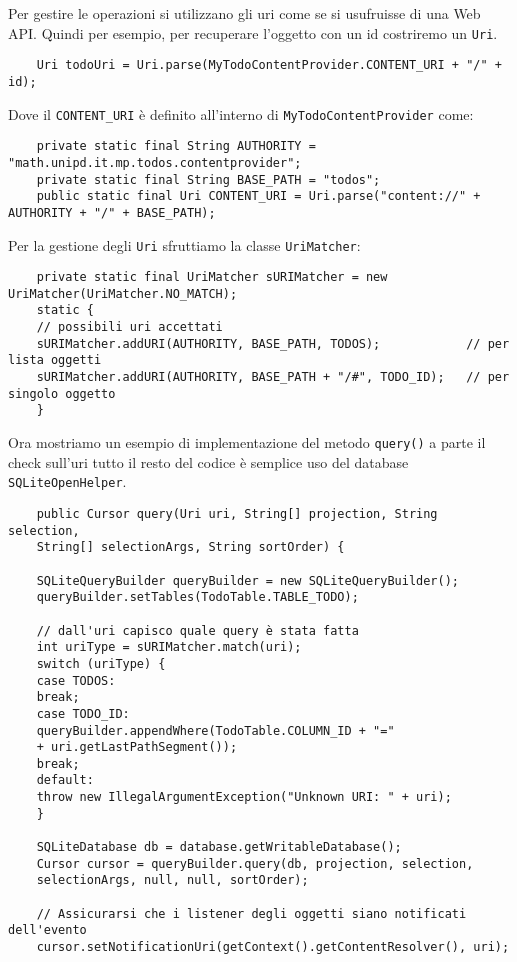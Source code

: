 \begin{itemize}
	Per gestire le operazioni si utilizzano gli uri come se si usufruisse di una Web API. Quindi per esempio, per recuperare l'oggetto con un id costriremo un \lstinline|Uri|.
	\begin{lstlisting}
	Uri todoUri = Uri.parse(MyTodoContentProvider.CONTENT_URI + "/" + id);
	\end{lstlisting}
	
	Dove il \lstinline|CONTENT_URI| è definito all'interno di \lstinline|MyTodoContentProvider| come:
	\begin{lstlisting}
	private static final String AUTHORITY = "math.unipd.it.mp.todos.contentprovider";
	private static final String BASE_PATH = "todos";
	public static final Uri CONTENT_URI = Uri.parse("content://" + AUTHORITY + "/" + BASE_PATH);
	\end{lstlisting}
	
	Per la gestione degli \lstinline|Uri| sfruttiamo la classe \lstinline|UriMatcher|:
	\begin{lstlisting}
	private static final UriMatcher sURIMatcher = new UriMatcher(UriMatcher.NO_MATCH);
	static {
	// possibili uri accettati
	sURIMatcher.addURI(AUTHORITY, BASE_PATH, TODOS);			// per lista oggetti
	sURIMatcher.addURI(AUTHORITY, BASE_PATH + "/#", TODO_ID);	// per singolo oggetto
	}
	\end{lstlisting}
	
	Ora mostriamo un esempio di implementazione del metodo \lstinline|query()| a parte il check sull'uri tutto il resto del codice è semplice uso del database \lstinline|SQLiteOpenHelper|.
	\begin{lstlisting}
	public Cursor query(Uri uri, String[] projection, String selection,
	String[] selectionArgs, String sortOrder) {
	
	SQLiteQueryBuilder queryBuilder = new SQLiteQueryBuilder();
	queryBuilder.setTables(TodoTable.TABLE_TODO);
	
	// dall'uri capisco quale query è stata fatta
	int uriType = sURIMatcher.match(uri);	
	switch (uriType) {
	case TODOS:
	break;
	case TODO_ID:
	queryBuilder.appendWhere(TodoTable.COLUMN_ID + "="
	+ uri.getLastPathSegment());
	break;
	default:
	throw new IllegalArgumentException("Unknown URI: " + uri);
	}
	
	SQLiteDatabase db = database.getWritableDatabase();
	Cursor cursor = queryBuilder.query(db, projection, selection,
	selectionArgs, null, null, sortOrder);
	
	// Assicurarsi che i listener degli oggetti siano notificati dell'evento
	cursor.setNotificationUri(getContext().getContentResolver(), uri);
	

\end{lstlisting}
\end{itemize}
